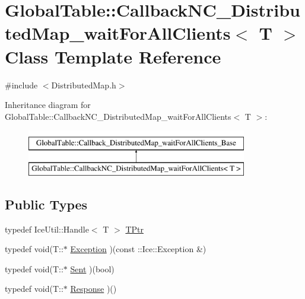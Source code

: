 \hypertarget{class_global_table_1_1_callback_n_c___distributed_map__wait_for_all_clients}{
\section{GlobalTable::CallbackNC\_\-DistributedMap\_\-waitForAllClients$<$ T $>$ Class Template Reference}
\label{class_global_table_1_1_callback_n_c___distributed_map__wait_for_all_clients}
}


{\ttfamily \#include $<$DistributedMap.h$>$}

Inheritance diagram for GlobalTable::CallbackNC\_\-DistributedMap\_\-waitForAllClients$<$ T $>$:\begin{figure}[H]
\begin{center}
\leavevmode
\includegraphics[height=2cm]{class_global_table_1_1_callback_n_c___distributed_map__wait_for_all_clients}
\end{center}
\end{figure}
\subsection*{Public Types}
\begin{DoxyCompactItemize}
\item 
typedef IceUtil::Handle$<$ T $>$ \hyperlink{class_global_table_1_1_callback_n_c___distributed_map__wait_for_all_clients_ad382f8070b09e44e81075151fd811634}{TPtr}
\item 
typedef void(T::$\ast$ \hyperlink{class_global_table_1_1_callback_n_c___distributed_map__wait_for_all_clients_a839e50155924aac25bbf989dadbc8275}{Exception} )(const ::Ice::Exception \&)
\item 
typedef void(T::$\ast$ \hyperlink{class_global_table_1_1_callback_n_c___distributed_map__wait_for_all_clients_a3ee9a892cbd5431e6d2cd0c48336f315}{Sent} )(bool)
\item 
typedef void(T::$\ast$ \hyperlink{class_global_table_1_1_callback_n_c___distributed_map__wait_for_all_clients_a86f9430f8e3319d74484f2c3678c36bd}{Response} )()
\end{DoxyCompactItemize}
